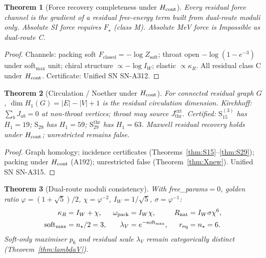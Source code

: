 \documentclass[11pt,a4paper]{article}
\newtheorem{theorem}{Theorem}
\theoremstyle{remark}
\begin{document}
\begin{theorem}[Force recovery completeness under $H_{\rm cont}$]
\label{thm:force}
Every residual force channel is the gradient of a residual free-energy term built from dual-route moduli only. Absolute SI force requires $F_\star$ (class M). Absolute MeV force is Impossible as dual-route C.
\end{theorem}

\begin{proof}
Channels: packing soft $F_{\mathrm{closed}}=-\log Z_{\mathrm{soft}}$; throat open $-\log(1-e^{-3})$ under soft$_{\max}$ unit; chiral structure $\propto -\log I_W$; elastic $\propto\kappa_R$. All residual class C under $H_{\rm cont}$. Certificate: Unified SN SN-A312.
\end{proof}

\begin{theorem}[Circulation / Noether under $H_{\rm cont}$]
\label{thm:noether}
For connected residual graph $G$, $\dim H_1(G)=|E|-|V|+1$ is the residual circulation dimension. Kirchhoff: $\sum_b J_{ab}=0$ at non-throat vertices; throat may source $J_{\mathrm{thr}}^{\mathrm{ext}}$. Certified: $\mathrm{S}_{15}^{(3)}$ has $H_1=19$; $\mathrm{S}_{29}$ has $H_1=59$; $\mathrm{S}_{29}^{\mathrm{thr}}$ has $H_1=63$. Maxwell residual recovery holds under $H_{\rm cont}$; unrestricted remains false.
\end{theorem}

\begin{proof}
Graph homology; incidence certificates (Theorems~\ref{thm:S15}--\ref{thm:S29}); packing under $H_{\rm cont}$ (A192); unrestricted false (Theorem~\ref{thm:Xnew}). Unified SN SN-A315.
\end{proof}

\begin{theorem}[Dual-route moduli consistency]
\label{thm:moduli}
With free\_params${=}0$, golden ratio $\varphi=(1+\sqrt{5})/2$, $\chi=\varphi^{-2}$, $I_W=1/\sqrt{5}$, $\sigma=\varphi^{-1}$:
\begin{equation}
\begin{aligned}
\kappa_R&=I_W+\chi,&
\omega_{\mathrm{pack}}&=I_W\chi,&
R_{\rm nat}&=I_W\sigma\chi^6,\\
\mathrm{soft}_{\max}&=n_\star/2=3,&
\lambda_V&=e^{-\mathrm{soft}_{\max}},&
r_{\mathrm{eq}}&=n_\star=6.
\end{aligned}
\end{equation}
Soft-only maximiser $p_6$ and residual scale $\lambda_V$ remain categorically distinct (Theorem~\ref{thm:lambdaV}).
\end{theorem}
\end{document}
